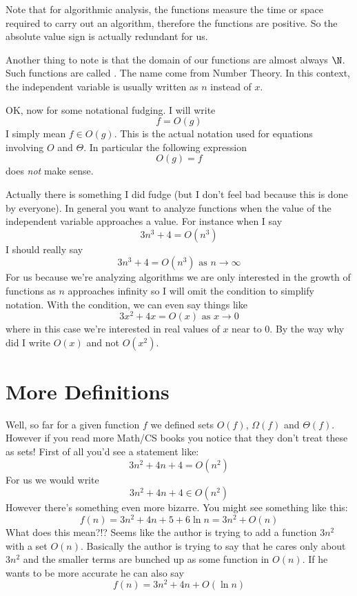 Note that for algorithmic analysis, the functions measure the time
or space required to carry out an algorithm, therefore the
functions are positive. So the absolute value sign is actually
redundant for us.


Another thing to note is that the domain of our functions are
almost always $\N$. Such functions are called
.
The name come from Number Theory. In this context, the
independent variable is usually written as $n$ instead of $x$.


OK, now for some notational fudging. I will write
\[
  f = O(g)
\]
I simply mean $f \in O(g)$. This is the actual notation used for
equations involving $O$ and $\Theta$. In particular the following
expression
\[
 O(g) = f
\]
does {\it not} make sense.

Actually there is something I did fudge (but I don't feel bad
because this is done by everyone). In general you want to analyze
functions when the value of the independent variable approaches a
value. For instance when I say
\[
 3n^3 + 4 = O(n^3)
\]
I should really say
\[
 3n^3 + 4 = O(n^3) \text{ as } n \rightarrow \infty
\]
For us because we're analyzing algorithms we are only interested
in the growth of functions as $n$ approaches infinity so I will
omit the condition to simplify notation. With the condition, we
can even say things like
\[
 3x^2 + 4x = O(x) \text{ as } x \rightarrow 0
\]
where in this case we're interested in real values of $x$ near to
0. By the way why did I write $O(x)$ and not $O(x^2)$.

\section{More Definitions}

Well, so far for a given function $f$ we defined sets $O(f)$,
$\Omega(f)$ and $\Theta(f)$. However if you read more Math/CS
books you notice that they don't treat these as sets! First of all
you'd see a statement like:
\[
   3n^2 + 4n + 4 = O(n^2)
\]
For us we would write
\[
   3n^2 + 4n + 4 \in O(n^2)
\]
However there's something even more bizarre. You might see
something like this:
\[
   f(n) = 3n^2 + 4n + 5 + 6 \ln n = 3n^2 + O(n)
\]
What does this mean?!? Seems like the author is trying to add a
function $3n^2$ with a set $O(n)$. Basically the author is trying
to say that he cares only about $3n^2$ and the smaller terms are
bunched up as some function in $O(n)$. If he wants to be more
accurate he can also say
\[
  f(n) = 3n^2 + 4n + O(\ln n)
\]


